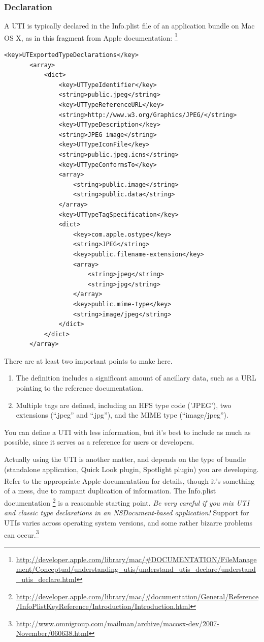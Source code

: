 \documentclass[11pt]{article}
\newcommand*{\apple}{Apple\textsuperscript{\textregistered}\xspace}
\begin{document}
\subsubsection{Declaration}
A UTI is typically declared in the Info.plist file of an application
bundle on Mac OS X, as in this fragment from \apple documentation:%
\footnote{\url{http://developer.apple.com/library/mac/\#DOCUMENTATION/FileManagement/Conceptual/understanding_utis/understand_utis_declare/understand_utis_declare.html}} 
\lstset{language=plist}
\begin{lstlisting}
<key>UTExportedTypeDeclarations</key>
       <array>
           <dict>
               <key>UTTypeIdentifier</key>
               <string>public.jpeg</string>
               <key>UTTypeReferenceURL</key>
               <string>http://www.w3.org/Graphics/JPEG/</string>
               <key>UTTypeDescription</key>
               <string>JPEG image</string>
               <key>UTTypeIconFile</key>
               <string>public.jpeg.icns</string>
               <key>UTTypeConformsTo</key>
               <array>
                   <string>public.image</string>
                   <string>public.data</string>
               </array>
               <key>UTTypeTagSpecification</key>
               <dict>
                   <key>com.apple.ostype</key>
                   <string>JPEG</string>
                   <key>public.filename-extension</key>
                   <array>
                       <string>jpeg</string>
                       <string>jpg</string>
                   </array>
                   <key>public.mime-type</key>
                   <string>image/jpeg</string>
               </dict>
           </dict>
       </array>
\end{lstlisting}
There are at least two important points to make here.
\begin{enumerate}
    \item
    The definition includes a significant amount of ancillary data, such as
    a URL pointing to the reference documentation.
    \item
    Multiple tags are defined, including an HFS type code ('JPEG'), two
    extensions (“.jpeg” and “.jpg”), and the MIME type (“image/jpeg”).
\end{enumerate}
You can define a UTI with less information, but it's best to include
as much as possible, since it serves as a reference for users or developers.

Actually using the UTI is another matter, and depends on the type of bundle
(standalone application, Quick Look plugin, Spotlight plugin) you are developing.
Refer to the appropriate \apple documentation for details, though it's something
of a mess, due to rampant duplication of information. The Info.plist documentation%
\footnote{\url{http://developer.apple.com/library/mac/\#documentation/General/Reference/InfoPlistKeyReference/Introduction/Introduction.html}} is a reasonable starting point. \emph{Be very careful if you
mix UTI and classic type declarations in an NSDocument-based application!}
Support for UTIs varies across operating system versions, and some rather
bizarre problems can occur.\footnote{\url{http://www.omnigroup.com/mailman/archive/macosx-dev/2007-November/060638.html}}
\end{document}
